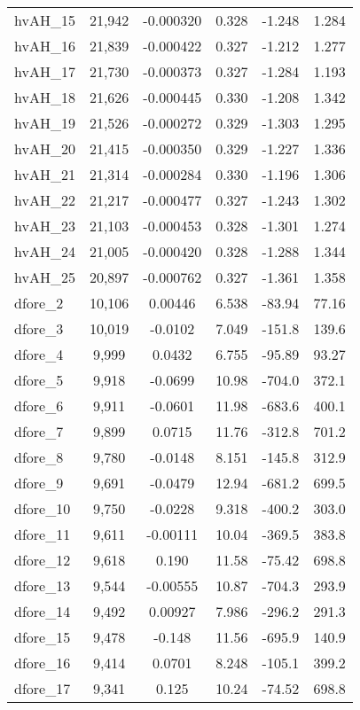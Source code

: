 \begin{tabular}{lccccc}
hvAH\_15 & 21,942 & -0.000320 & 0.328 & -1.248 & 1.284 \\
hvAH\_16 & 21,839 & -0.000422 & 0.327 & -1.212 & 1.277 \\
hvAH\_17 & 21,730 & -0.000373 & 0.327 & -1.284 & 1.193 \\
hvAH\_18 & 21,626 & -0.000445 & 0.330 & -1.208 & 1.342 \\
hvAH\_19 & 21,526 & -0.000272 & 0.329 & -1.303 & 1.295 \\
hvAH\_20 & 21,415 & -0.000350 & 0.329 & -1.227 & 1.336 \\
hvAH\_21 & 21,314 & -0.000284 & 0.330 & -1.196 & 1.306 \\
hvAH\_22 & 21,217 & -0.000477 & 0.327 & -1.243 & 1.302 \\
hvAH\_23 & 21,103 & -0.000453 & 0.328 & -1.301 & 1.274 \\
hvAH\_24 & 21,005 & -0.000420 & 0.328 & -1.288 & 1.344 \\
hvAH\_25 & 20,897 & -0.000762 & 0.327 & -1.361 & 1.358 \\
dfore\_2 & 10,106 & 0.00446 & 6.538 & -83.94 & 77.16 \\
dfore\_3 & 10,019 & -0.0102 & 7.049 & -151.8 & 139.6 \\
dfore\_4 & 9,999 & 0.0432 & 6.755 & -95.89 & 93.27 \\
dfore\_5 & 9,918 & -0.0699 & 10.98 & -704.0 & 372.1 \\
dfore\_6 & 9,911 & -0.0601 & 11.98 & -683.6 & 400.1 \\
dfore\_7 & 9,899 & 0.0715 & 11.76 & -312.8 & 701.2 \\
dfore\_8 & 9,780 & -0.0148 & 8.151 & -145.8 & 312.9 \\
dfore\_9 & 9,691 & -0.0479 & 12.94 & -681.2 & 699.5 \\
dfore\_10 & 9,750 & -0.0228 & 9.318 & -400.2 & 303.0 \\
dfore\_11 & 9,611 & -0.00111 & 10.04 & -369.5 & 383.8 \\
dfore\_12 & 9,618 & 0.190 & 11.58 & -75.42 & 698.8 \\
dfore\_13 & 9,544 & -0.00555 & 10.87 & -704.3 & 293.9 \\
dfore\_14 & 9,492 & 0.00927 & 7.986 & -296.2 & 291.3 \\
dfore\_15 & 9,478 & -0.148 & 11.56 & -695.9 & 140.9 \\
dfore\_16 & 9,414 & 0.0701 & 8.248 & -105.1 & 399.2 \\
dfore\_17 & 9,341 & 0.125 & 10.24 & -74.52 & 698.8 \\

\end{tabular}
